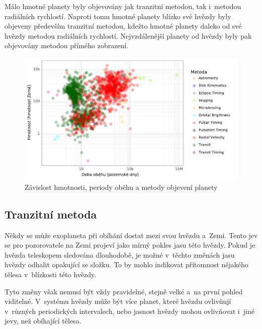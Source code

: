 \documentclass[a4paper,12pt]{article}
\begin{document}
Málo hmotné planety byly objevovány jak tranzitní metodou, tak i~metodou radiálních rychlostí. Naproti tomu hmotné planety blízko své hvězdy byly objeveny především tranzitní metodou, kdežto hmotné planety daleko od své hvězdy metodou radiálních rychlostí. Nejvzdálenější planety od hvězdy byly pak objevovány metodou přímého zobrazení.

\begin{figure}[!htb]
\begin{center}
\includegraphics[width=\textwidth]{stats/period_by_mass_by_method.pdf}
\caption[Závislost hmotnosti, periody oběhu a metody objevení planety]{Závislost hmotnosti, periody oběhu a metody objevení planety}
\end{center}
\end{figure}

\clearpage

\subsection{Tranzitní metoda}

Někdy se může exoplaneta při obíhání dostat mezi svou hvězdu a~Zemi. Tento jev se pro pozorovatele na Zemi projeví jako mírný pokles jasu této hvězdy. Pokud je hvězda teleskopem sledována dlouhodobě, je možné v~těchto změnách jasu hvězdy odhalit opakující se složku. To by mohlo indikovat přítomnost nějakého tělesa v~blízkosti této hvězdy.

Tyto změny však nemusí být vždy pravidelné, stejně velké a~na první pohled viditelné. V~systému hvězdy může být více planet, které hvězdu ovlivňují v~různých periodických intervalech, nebo jasnost hvězdy mohou ovlivňovat i~jiné jevy, než obíhající tělesa.
\end{document}
